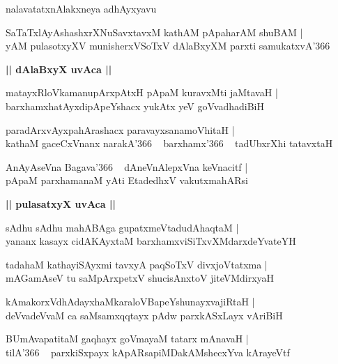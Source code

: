 \documentclass[twoside,12pt,openright]{book}
\newcounter{shloka}[chapter]
\def\uvaca#1{\centerline{{\large\textbf{#1}}}}
\begin{document}
\begin{center}
nalavatatxnAlakxneya adhAyxyavu
\end{center}

\begin{shloka}%
SaTaTxlAyAshashxrXNuSavxtavxM kathAM pApaharAM shuBAM |\\
yAM pulasotxyXV munisherxVSoTxV dAlaBxyXM parxti samukatxvA\char'366 
\end{shloka}

\uvaca{|| dAlaBxyX uvAca ||}

\begin{shloka}%
matayxRloVkamanupArxpAtxH pApaM kuravxMti jaMtavaH |\\
barxhamxhatAyxdipApeYshacx yukAtx yeV goVvadhadiBiH
\end{shloka}

\begin{shloka}%
paradArxvAyxpahArashacx paravayxsanamoVhitaH |\\
kathaM gaceCxVnanx narakA\char'366 ~ barxhamx\char'366 ~ tadUbxrXhi tatavxtaH 
\end{shloka}

\begin{shloka}%
AnAyAseVna Bagava\char'366 ~ dAneVnAlepxVna keVnacitf |\\
pApaM parxhamanaM yAti EtadedhxV vakutxmahARsi 
\end{shloka}

\uvaca{|| pulasatxyX uvAca ||}

\begin{shloka}%
sAdhu sAdhu mahABAga gupatxmeVtadudAhaqtaM |\\
yananx kasayx cidAKAyxtaM barxhamxviSiTxvXMdarxdeYvateYH 
\end{shloka}

\begin{shloka}%
tadahaM kathayiSAyxmi tavxyA paqSoTxV divxjoVtatxma |\\
mAGamAseV tu saMpArxpetxV shucisAnxtoV jiteVMdirxyaH
\end{shloka}

\begin{shloka}%
kAmakorxVdhAdayxhaMkaraloVBapeYshunayxvajiRtaH |\\
deVvadeVvaM ca saMsamxqqtayx pAdw parxkASxLayx vAriBiH
\end{shloka}

\begin{shloka}%
BUmAvapatitaM gaqhayx goVmayaM tatarx mAnavaH |\\
tilA\char'366 ~ parxkiSxpayx kApARsapiMDakAMshecxYva kArayeVtf
\end{shloka}
\end{document}
